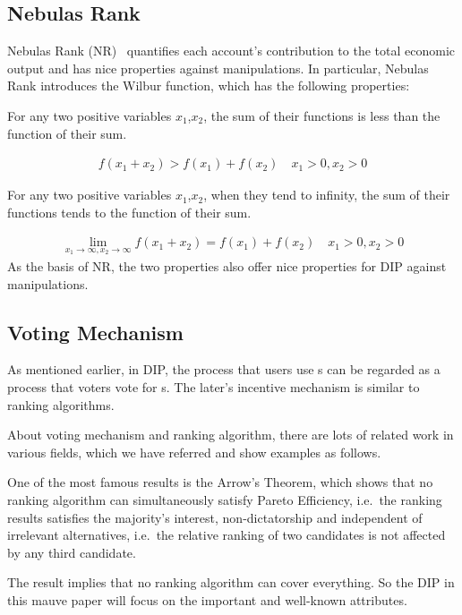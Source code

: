 \subsection{Nebulas Rank}
Nebulas Rank (NR)~\cite{Nebulasyellowpaper} quantifies each account's contribution to the total economic output and has nice properties against manipulations. In particular, Nebulas Rank introduces the Wilbur function, which has the following properties:

\begin{property}
	\label{prop:one}
	For any two positive variables $x_1$,$x_2$, the sum of their functions is less than the function of their sum.
\end{property}
\begin{align}
	f(x_1+x_2)>f(x_1)+f(x_2) \quad x_1>0,x_2>0
\end{align}
\begin{property}
	\label{prop:two}
	For any two positive variables $x_1$,$x_2$, when they tend to infinity, the sum of their functions tends to the function of their sum.
\end{property}

\begin{align}
	\lim\limits_{x_1 \to \infty, x_2\to \infty} f(x_1+x_2) = f(x_1) + f(x_2)\quad x_1>0, x_2>0
\end{align}
\noindent As the basis of NR, the two properties also offer nice properties for DIP against manipulations.

\subsection{Voting Mechanism}
As mentioned earlier, in DIP, the process that users use {\dapp}s can be regarded as a process that voters vote for {\dapp}s. The later's incentive mechanism is similar to ranking algorithms.

About voting mechanism and ranking algorithm, there are lots of related work in various fields, which we have referred and show examples as follows.

One of the most famous results is the Arrow's Theorem, which shows that no
ranking algorithm can simultaneously satisfy Pareto Efficiency, i.e.\, the
ranking results satisfies the majority's interest, non-dictatorship and
independent of irrelevant alternatives, i.e.\ the relative ranking of two candidates is not affected by any third candidate.

The result implies that no ranking algorithm can cover everything. So the DIP
in this mauve paper will focus on the important and well-known attributes.

